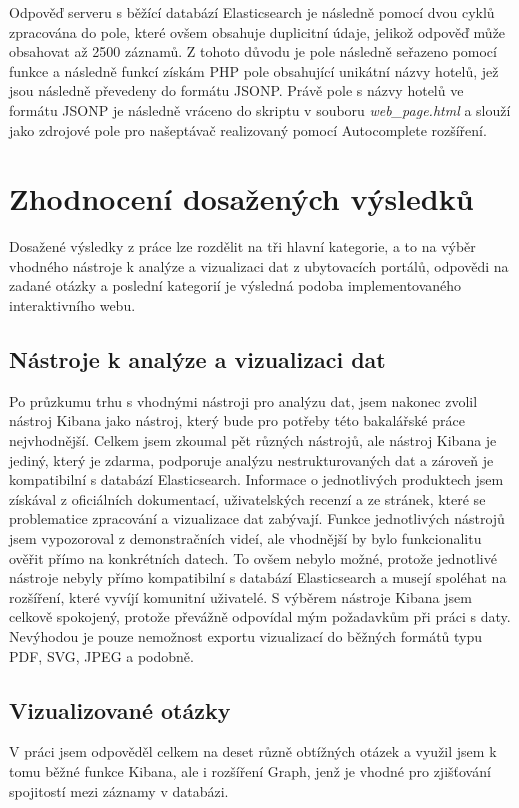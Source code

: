 \documentclass[czech,BP]{thesiskiv}
\begin{document}
Odpověď serveru s běžící databází Elasticsearch je následně pomocí dvou cyklů zpracována do pole, které ovšem obsahuje duplicitní údaje, jelikož odpověď může obsahovat až 2500 záznamů. Z tohoto důvodu je pole následně seřazeno pomocí funkce  a následně funkcí  získám PHP pole obsahující unikátní názvy hotelů, jež jsou následně převedeny do formátu JSONP. Právě pole s názvy hotelů ve formátu JSONP je následně vráceno do skriptu v souboru \textit{web\_page.html} a slouží jako zdrojové pole pro našeptávač realizovaný pomocí Autocomplete rozšíření.

\chapter{Zhodnocení dosažených výsledků}
Dosažené výsledky z práce lze rozdělit na tři hlavní kategorie, a to na výběr vhodného nástroje k analýze a  vizualizaci dat z ubytovacích portálů, odpovědi na zadané otázky a poslední kategorií je výsledná podoba implementovaného interaktivního webu.

\section{Nástroje k analýze a vizualizaci dat}
Po průzkumu trhu s vhodnými nástroji pro analýzu dat, jsem nakonec zvolil nástroj Kibana jako nástroj, který bude pro potřeby této bakalářské práce nejvhodnější.  Celkem jsem zkoumal pět různých nástrojů, ale nástroj Kibana je jediný, který je zdarma, podporuje analýzu nestrukturovaných dat a zároveň je kompatibilní s databází Elasticsearch. Informace o jednotlivých  produktech jsem získával z oficiálních dokumentací, uživatelských recenzí a ze stránek, které se problematice zpracování a vizualizace dat zabývají. Funkce jednotlivých nástrojů jsem vypozoroval z demonstračních videí, ale vhodnější by bylo funkcionalitu ověřit přímo na konkrétních datech. To ovšem nebylo možné, protože jednotlivé nástroje nebyly přímo kompatibilní s databází Elasticsearch a musejí spoléhat na rozšíření, které vyvíjí komunitní uživatelé. S výběrem nástroje Kibana jsem celkově spokojený, protože převážně odpovídal mým požadavkům při práci s daty. Nevýhodou je pouze nemožnost exportu vizualizací do běžných formátů typu PDF, SVG, JPEG a podobně.

\section{Vizualizované otázky}
V práci jsem odpověděl celkem na deset různě obtížných otázek a využil jsem k tomu běžné funkce Kibana, ale i rozšíření Graph, jenž je vhodné pro zjišťování spojitostí mezi záznamy v databázi. 
\end{document}
